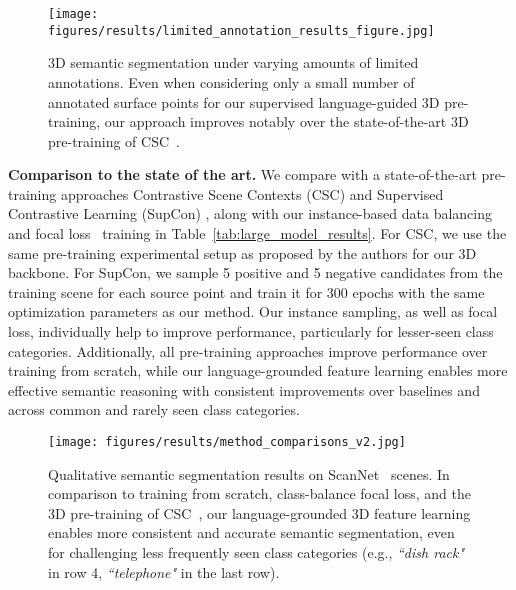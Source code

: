 \begin{figure}[!t]
    \centering
    \texttt{[image: figures/results/limited\_annotation\_results\_figure.jpg]}
\caption{
    3D semantic segmentation under varying amounts of limited annotations.
    Even when considering only a small number of annotated surface points for our supervised language-guided 3D pre-training, our approach improves notably over the state-of-the-art 3D pre-training of CSC~\cite{scene_contrast}. }
    \label{fig:limitedann}
\end{figure}

\smallskip
\noindent \textbf{Comparison to the state of the art.}
We compare with a state-of-the-art  pre-training approaches Contrastive Scene Contexts (CSC) \cite{scene_contrast} and Supervised Contrastive Learning (SupCon) \cite{supcontrast}, along with our instance-based data balancing and focal loss~\cite{focalloss} training in Table~\ref{tab:large_model_results}.
For CSC, we use the same pre-training experimental setup as proposed by the authors for our 3D backbone. 
For SupCon, we sample 5 positive and 5 negative candidates from the training scene for each source point and train it for 300 epochs with the same optimization parameters as our method.
Our instance sampling, as well as focal loss, individually help to improve performance, particularly for lesser-seen class categories.
Additionally, all pre-training approaches improve performance over training from scratch, while our language-grounded feature learning enables more effective semantic reasoning with consistent improvements over baselines and across common and rarely seen class categories.

\begin{figure}
    \centering
    \texttt{[image: figures/results/method\_comparisons\_v2.jpg]}
\caption{Qualitative semantic segmentation results on ScanNet~\cite{scannet} scenes. 
    In comparison to training from scratch, class-balance focal loss, and the 3D pre-training of CSC~\cite{scene_contrast}, our language-grounded 3D feature learning enables more consistent and accurate semantic segmentation, even for challenging less frequently seen class categories (e.g., \textit{``dish rack"} in row 4, \textit{``telephone"} in the last row).}
    \label{fig:methods_comparison}
\end{figure}



